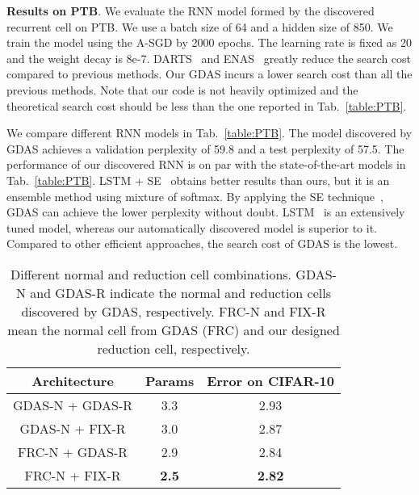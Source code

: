 \documentclass[10pt,twocolumn,letterpaper]{article}
\def\Tabref#1{Tab.~\ref{#1}}
\begin{document}
\textbf{Results on PTB}.
We evaluate the RNN model formed by the discovered recurrent cell on PTB.
We use a batch size of 64 and a hidden size of 850.
We train the model using the A-SGD by 2000 epochs.
The learning rate is fixed as 20 and the weight decay is 8e-7.
DARTS~\cite{liu2019darts} and ENAS~\cite{pmlr-v80-pham18a} greatly reduce the search cost compared to previous methods.
Our GDAS incurs a lower search cost than all the previous methods.
Note that our code is not heavily optimized and the theoretical search cost should be less than the one reported in \Tabref{table:PTB}.


We compare different RNN models in \Tabref{table:PTB}.
The model discovered by GDAS achieves a validation perplexity of 59.8 and a test perplexity of 57.5.
The performance of our discovered RNN is on par with the state-of-the-art models in \Tabref{table:PTB}.
LSTM + SE~\cite{yang2018breaking} obtains better results than ours, but it is an ensemble method using mixture of softmax.
By applying the SE technique~\cite{yang2018breaking}, GDAS can achieve the lower perplexity without doubt.
LSTM~\cite{merity2018regularizing} is an extensively tuned model, whereas our automatically discovered model is superior to it.
Compared to other efficient approaches, the search cost of GDAS is the lowest.




\begin{table}[t!]
\centering
\setlength{\tabcolsep}{4pt}
\begin{tabular}{| c | c | c |} \hline\hline

 Architecture     & Params       & Error on CIFAR-10  \\\hline
 GDAS-N + GDAS-R  & 3.3          &  2.93              \\
 GDAS-N + FIX-R   & 3.0          &  2.87              \\ FRC-N  + GDAS-R  & 2.9          &  2.84              \\
 FRC-N  + FIX-R   & \textbf{2.5} &  \textbf{2.82}     \\
\hline\hline
\end{tabular}
\vspace{2mm}
\caption{
Different normal and reduction cell combinations.
GDAS-N and GDAS-R indicate the normal and reduction cells discovered by GDAS, {respectively}.
FRC-N and FIX-R mean the normal cell from GDAS (FRC) and our designed reduction cell, {respectively}.
}
\label{table:ablative}
\end{table}
\end{document}
